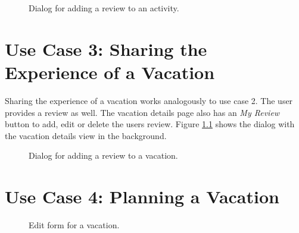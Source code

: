 \documentclass[IN,english]{tumbook}
\begin{document}
\begin{figure}
	
	\caption{Dialog for adding a review to an activity.}
	\label{fig:dialog-activity-review}
\end{figure}

\chapter{Use Case 3: Sharing the Experience of a Vacation}

Sharing the experience of a vacation works analogously to use case 2. The user provides a review as well. The vacation details page also has an \emph{My Review} button to add, edit or delete the users review. Figure \ref{fig:dialog-vacation-review} shows the dialog with the vacation details view in the background.

\begin{figure}
	
	\caption{Dialog for adding a review to a vacation.}
	\label{fig:dialog-vacation-review}
\end{figure}

\chapter{Use Case 4: Planning a Vacation}

\begin{figure}
	
	\caption{Edit form for a vacation.}
\end{figure}
\end{document}
